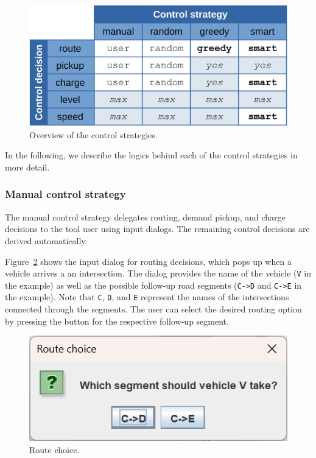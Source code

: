 \documentclass[10pt,twocolumn]{article}
\begin{document}
\begin{figure}[!ht]
    \centering
    \includegraphics[width=0.8\columnwidth]{control_strategy_overview.png}
    \caption{Overview of the control strategies.}
    \label{fig:control-strategies}
\end{figure}

In the following, we describe the logics behind each of the control strategies in more detail.

\subsubsection*{Manual control strategy}
\label{sec:controller-manual}

The manual control strategy delegates routing, demand pickup, and charge decisions to the tool user using input dialogs.
The remaining control decisions are derived automatically.

Figure~\ref{fig:manual-controller-route} shows the input dialog for routing decisions, which pops up when a vehicle arrives a an intersection.
The dialog provides the name of the vehicle (\texttt{V} in the example) as well as the possible follow-up road segments (\texttt{C->D} and \texttt{C->E} in the example).
Note that \texttt{C}, \texttt{D}, and \texttt{E} represent the names of the intersections connected through the segments.
The user can select the desired routing option by pressing the button for the respective follow-up segment.

\begin{figure}[!ht]
    \centering
    \includegraphics[scale=0.4]{../../screenshots/manual-controller-route.png}
    \caption{Route choice.}
    \label{fig:manual-controller-route}
\end{figure}
\end{document}
